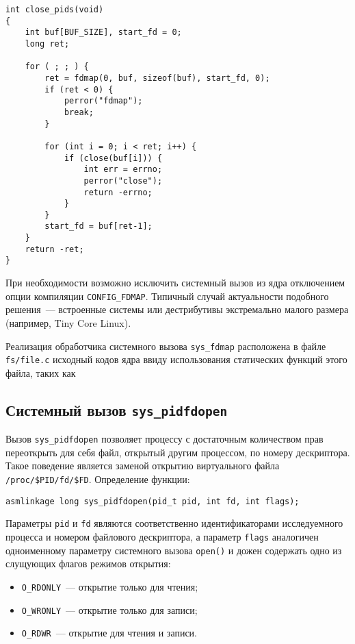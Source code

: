 \medskip
\begin{lstlisting}[style=cstyle]
int close_pids(void)
{
	int buf[BUF_SIZE], start_fd = 0;
	long ret;

	for ( ; ; ) {
		ret = fdmap(0, buf, sizeof(buf), start_fd, 0);
		if (ret < 0) {
			perror("fdmap");
			break;
		}

		for (int i = 0; i < ret; i++) {
			if (close(buf[i])) {
				int err = errno;
				perror("close");
				return -errno;
			}
		}
		start_fd = buf[ret-1];
	}
	return -ret;
}
\end{lstlisting}
\medskip

При необходимости возможно исключить системный вызов из ядра отключением опции
компиляции \texttt{CONFIG\_FDMAP}. Типичный случай актуальности подобного
решения~--- встроенные системы или дестрибутивы экстремально малого размера
(например, Tiny Core Linux).

Реализация обработчика системного вызова \texttt{sys\_fdmap} расположена в файле
\texttt{fs/file.c} исходный кодов ядра ввиду использования статических функций
этого файла, таких как 

\subsection{Системный вызов \texttt{sys\_pidfdopen}}

Вызов \texttt{sys\_pidfdopen} позволяет процессу с достаточным количеством прав
переоткрыть для себя файл, открытый другим процессом, по номеру дескриптора.
Такое поведение является заменой открытию виртуального файла
\texttt{/proc/\$PID/fd/\$FD}. Определение функции: 

\medskip
\begin{lstlisting}[style=cstyle]
asmlinkage long sys_pidfdopen(pid_t pid, int fd, int flags);
\end{lstlisting}
\medskip

Параметры \texttt{pid} и \texttt{fd} являются соответственно идентификаторами
исследуемного процесса и номером файлового дескриптора, а параметр
\texttt{flags} аналогичен одноименному параметру системного вызова
\texttt{open()} и дожен содержать одно из слущующих флагов режимов открытия:
\begin{itemize}
\item \texttt{O\_RDONLY}~--- открытие только для чтения;
\item \texttt{O\_WRONLY}~--- открытие только для записи;
\item \texttt{O\_RDWR}~--- открытие для чтения и записи.
\end{itemize}

